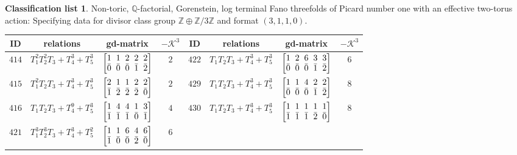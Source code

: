 \documentclass[10pt,a4paper]{amsart}
\theoremstyle{definition}
\newtheorem{class-list}[thm]{Classification list}
\def\ZZ{{\mathbb Z}}
\def\QQ{{\mathbb Q}}
\numberwithin{equation}{section}
\begin{document}
\begin{class-list}
Non-toric, $\QQ$-factorial, Gorenstein, log terminal Fano
threefolds of Picard number one with an effective two-torus action:
Specifying data for divisor class group $\ZZ\oplus \ZZ/3\ZZ$
and format $(3,1,1,0)$.
\begin{table}[h!]\centering\setlength{\tabcolsep}{3.5pt}
\renewcommand{\arraystretch}{1.35}\small\tabulinesep=1mm
\begin{tabu}{c|c|c|c||c|c|c|c}
\hline
ID&relations&gd-matrix&$-\mathcal{K}^3$&ID&relations&gd-matrix&$-\mathcal{K}^3$
\\
\hline
${414}$&${T_{1}^{2}T_{2}^{2}T_{3}+T_{4}^{3}+T_{5}^{3}}$
&$\arraycolsep=1mm\begin{bmatrix}{1} & {1} & {2} & {2} & {2} \\ {\bar{0}} & {\bar{0}} & {\bar{0}} & {\bar{1}} & {\bar{2}}\end{bmatrix}$&${2}$
&${422}$&${T_{1}T_{2}T_{3}+T_{4}^{3}+T_{5}^{3}}$
&$\arraycolsep=1mm\begin{bmatrix}{1} & {2} & {6} & {3} & {3} \\ {\bar{0}} & {\bar{0}} & {\bar{0}} & {\bar{1}} & {\bar{2}}\end{bmatrix}$&${6}$
\\
\hline
${415}$&${T_{1}^{2}T_{2}T_{3}+T_{4}^{3}+T_{5}^{3}}$
&$\arraycolsep=1mm\begin{bmatrix}{2} & {1} & {1} & {2} & {2} \\ {\bar{1}} & {\bar{2}} & {\bar{2}} & {\bar{2}} & {\bar{0}}\end{bmatrix}$&${2}$
&${429}$&${T_{1}T_{2}T_{3}+T_{4}^{3}+T_{5}^{3}}$
&$\arraycolsep=1mm\begin{bmatrix}{1} & {1} & {4} & {2} & {2} \\ {\bar{0}} & {\bar{0}} & {\bar{0}} & {\bar{1}} & {\bar{2}}\end{bmatrix}$&${8}$
\\
\hline
${416}$&${T_{1}T_{2}T_{3}+T_{4}^{9}+T_{5}^{3}}$
&$\arraycolsep=1mm\begin{bmatrix}{1} & {4} & {4} & {1} & {3} \\ {\bar{1}} & {\bar{1}} & {\bar{1}} & {\bar{0}} & {\bar{1}}\end{bmatrix}$&${4}$
&${430}$&${T_{1}T_{2}T_{3}+T_{4}^{3}+T_{5}^{3}}$
&$\arraycolsep=1mm\begin{bmatrix}{1} & {1} & {1} & {1} & {1} \\ {\bar{1}} & {\bar{1}} & {\bar{1}} & {\bar{2}} & {\bar{0}}\end{bmatrix}$&${8}$
\\
\hline
${421}$&${T_{1}^{3}T_{2}^{3}T_{3}+T_{4}^{3}+T_{5}^{2}}$
&$\arraycolsep=1mm\begin{bmatrix}{1} & {1} & {6} & {4} & {6} \\ {\bar{1}} & {\bar{0}} & {\bar{0}} & {\bar{2}} & {\bar{0}}\end{bmatrix}$&${6}$
\\
\end{tabu}\vspace{2mm}
\end{table}
\end{class-list}
\end{document}
